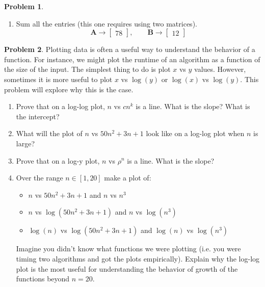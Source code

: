 \documentclass[12pt]{article}
\theoremstyle{definition}
\newtheorem{problem}{Problem}
\renewcommand{\vec}{\mathbf}
\begin{document}
\begin{problem}
\begin{enumerate}
    \item Sum all the entries (this one requires using two matrices).
    \[
        \vec{A} \to  
        \begin{bmatrix}
            78
        \end{bmatrix}
        ,\qquad 
        \vec{B} \to 
        \begin{bmatrix}
            12
        \end{bmatrix}
    \]

    \end{enumerate}
\end{problem}


\begin{problem}
    Plotting data is often a useful way to understand the behavior of a function. For instance, we might plot the runtime of an algorithm as a function of the size of the input.
    The simplest thing to do is plot $x$ vs $y$ values. 
    However, sometimes it is more useful to plot $x$ vs $\log(y)$ or $\log(x)$ vs $\log(y)$.
    This problem will explore why this is the case.

    \begin{enumerate}
        \item Prove that on a log-log plot, $n$ vs $c n^k$ is a line. What is the slope? What is the intercept?
        \item What will the plot of $n$ vs $50n^2 + 3n + 1$ look like on a log-log plot when $n$ is large?
        \item Prove that on a log-y plot, $n$ vs $\rho^n$ is a line. What is the slope?
        \item Over the range $n\in[1,20]$ make a plot of:
        \begin{itemize}
            \item  $n$ vs $50n^2+3n+1$ and $n$ vs $n^3$ 
            \item $n$ vs $\log(50n^2+3n+1)$ and $n$ vs $\log(n^3)$
            \item $\log(n)$ vs $\log(50n^2+3n+1)$ and $\log(n)$ vs $\log(n^3)$
        \end{itemize}
        
        Imagine you didn't know what functions we were plotting (i.e. you were timing two algorithms and got the plots empirically). 
        Explain why the log-log plot is the most useful for understanding the behavior of growth of the functions beyond $n=20$.
    \end{enumerate}

\end{problem}
\end{document}
